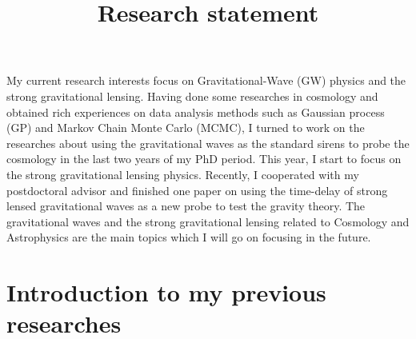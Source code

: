 \documentclass[11pt,letterpaper,sans]{moderncv}   %
\title{Research statement}
\begin{document}
\pagestyle{headonly}


\maketitle









My current research interests focus on Gravitational-Wave (GW) physics and the strong gravitational lensing. Having done some researches in cosmology and  obtained rich experiences on data analysis methods such as Gaussian process (GP) and Markov Chain Monte Carlo (MCMC), I turned to work on the researches about using the gravitational waves as the standard sirens to probe the cosmology in the last two years of my PhD period. This year, I start to focus on the strong gravitational lensing physics. Recently, I cooperated with my postdoctoral advisor and finished one paper on using the time-delay of strong lensed gravitational waves as a new probe to test the gravity theory. The gravitational waves and the strong gravitational lensing related to Cosmology and  Astrophysics are the main topics which I will go on focusing in the future. 
\vspace{5mm}



\section{\textcolor{color1}{\textbf{Introduction to my previous researches}}}
\end{document}
